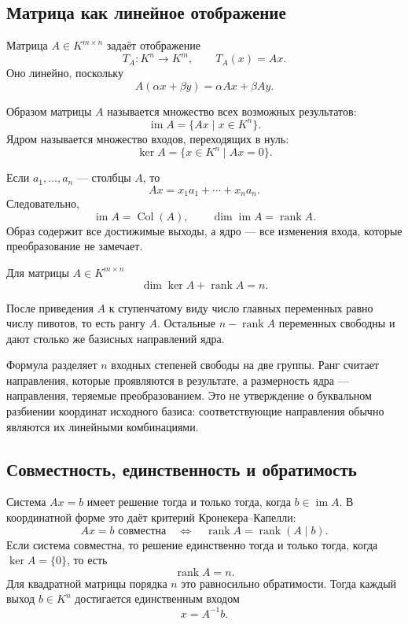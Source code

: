 \subsection{Матрица как линейное отображение}

Матрица \(A\in K^{m\times n}\) задаёт отображение
\[
T_A\colon K^n\to K^m,
\qquad
T_A(x)=Ax.
\]
Оно линейно, поскольку
\[
A(\alpha x+\beta y)=\alpha Ax+\beta Ay.
\]

\begin{definition}
Образом матрицы \(A\) называется множество всех возможных результатов:
\[
\operatorname{im}A
=
\{Ax\mid x\in K^n\}.
\]
Ядром называется множество входов, переходящих в нуль:
\[
\ker A
=
\{x\in K^n\mid Ax=0\}.
\]
\end{definition}

Если \(a_1,\dots,a_n\) --- столбцы \(A\), то
\[
Ax=x_1a_1+\cdots+x_na_n.
\]
Следовательно,
\[
\operatorname{im}A=\operatorname{Col}(A),
\qquad
\dim\operatorname{im}A=\operatorname{rank}A.
\]
Образ содержит все достижимые выходы, а ядро --- все изменения входа, которые преобразование не замечает.

\begin{theorem}
Для матрицы \(A\in K^{m\times n}\)
\[
\dim\ker A+\operatorname{rank}A=n.
\]
\end{theorem}

\begin{proofidea}
После приведения \(A\) к ступенчатому виду число главных переменных равно числу пивотов, то есть рангу \(A\). Остальные \(n-\operatorname{rank}A\) переменных свободны и дают столько же базисных направлений ядра.
\end{proofidea}

Формула разделяет \(n\) входных степеней свободы на две группы. Ранг считает направления, которые проявляются в результате, а размерность ядра --- направления, теряемые преобразованием. Это не утверждение о буквальном разбиении координат исходного базиса: соответствующие направления обычно являются их линейными комбинациями.

\subsection{Совместность, единственность и обратимость}

Система \(Ax=b\) имеет решение тогда и только тогда, когда \(b\in\operatorname{im}A\). В координатной форме это даёт критерий Кронекера--Капелли:
\[
Ax=b \text{ совместна}
\quad\Longleftrightarrow\quad
\operatorname{rank}A
=
\operatorname{rank}(A\mid b).
\]
Если система совместна, то решение единственно тогда и только тогда, когда \(\ker A=\{0\}\), то есть
\[
\operatorname{rank}A=n.
\]
Для квадратной матрицы порядка \(n\) это равносильно обратимости. Тогда каждый выход \(b\in K^n\) достигается единственным входом
\[
x=A^{-1}b.
\]

